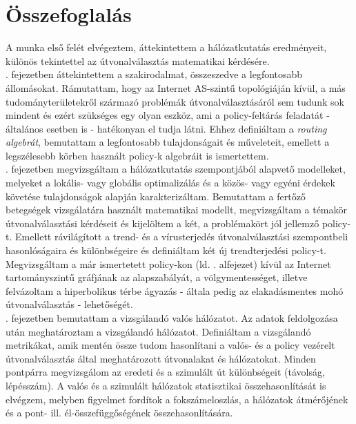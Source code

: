 \chapter{Összefoglalás}\label{summary}

A munka első felét elvégeztem, áttekintettem a hálózatkutatás eredményeit, különös tekintettel az útvonalválasztás matematikai kérdésére.\\

. fejezetben áttekintettem a szakirodalmat, összeszedve a legfontosabb állomásokat. Rámutattam, hogy az Internet AS-szintű topológiáján kívül, a más tudományterületekről származó problémák útvonalválasztásáról sem tudunk sok mindent és ezért szükséges egy olyan eszköz, ami a policy-feltárás feladatát - általános esetben is - hatékonyan el tudja látni. Ehhez definiáltam a \emph{routing algebrát}, bemutattam a legfontosabb tulajdonságait és műveleteit, emellett a legszélesebb körben használt policy-k algebráit is ismertettem.\\

. fejezetben megvizsgáltam a hálózatkutatás szempontjából alapvető modelleket, melyeket a lokális- vagy globális optimalizálás és a közös- vagy egyéni érdekek követése tulajdonságok alapján karakterizáltam. Bemutattam a fertőző betegségek vizsgálatára használt matematikai modellt, megvizsgáltam a témakör útvonalválasztási kérdéseit és kijelöltem a két, a problémakört jól jellemző policy-t. Emellett rávilágított a trend- és a vírusterjedés útvonalválasztási szempontbeli hasonlóságaira és különbségeire és definiáltam két új trendterjedési policy-t.\newline
Megvizsgáltam a már ismertetett policy-kon (ld. . alfejezet) kívül az Internet tartományszintű gráfjának az alapszabályát, a völgymentességet, illetve felvázoltam a hiperbolikus térbe ágyazás - általa pedig az elakadásmentes mohó útvonalválasztás - lehetőségét.\\

. fejezetben bemutattam a vizsgálandó valós hálózatot. Az adatok feldolgozása után meghatároztam a vizsgálandó hálózatot. Definiáltam a vizsgálandó metrikákat, amik mentén össze tudom hasonlítani a valós- és a policy vezérelt útvonalválasztás által meghatározott útvonalakat és hálózatokat. Minden pontpárra megvizsgálom az eredeti és a szimulált út különbségeit (távolság, lépésszám). A valós és a szimulált hálózatok statisztikai összehasonlítását is elvégzem, melyben figyelmet fordítok a fokszámeloszlás, a hálózatok átmérőjének és a pont- ill. él-összefüggőségének összehasonlítására.
